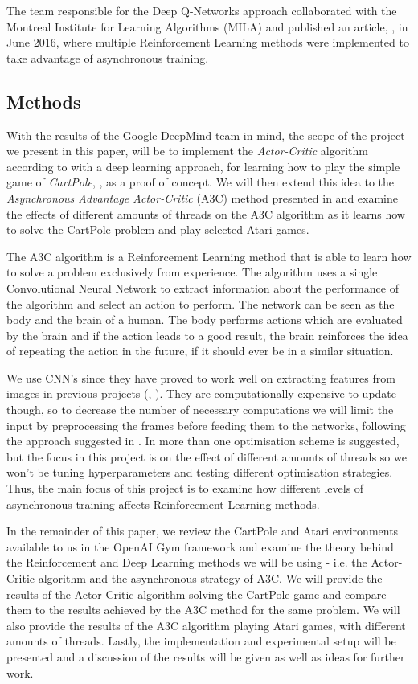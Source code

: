 \documentclass[11pt]{article}
\begin{document}
The team responsible for the Deep Q-Networks approach collaborated with
the Montreal Institute for Learning Algorithms (MILA) and published
an article, \cite{a3c}, in June 2016, where multiple Reinforcement Learning methods were implemented to
take advantage of asynchronous training.

\subsection{Methods}

With the results of the Google DeepMind team in mind, the scope of the project we present in
this paper, will be to implement the \textit{Actor-Critic} algorithm according to \cite{RLbook}
with a deep learning approach, for learning how to play the simple game of \textit{CartPole}, \cite{cart_pole},
as a proof of concept.
We will then extend this idea to the \textit{Asynchronous Advantage Actor-Critic} (A3C)
method presented in \cite{a3c} and examine the effects of different amounts of threads
on the A3C algorithm as it learns how to solve the CartPole problem and play selected Atari games.

The A3C algorithm is a Reinforcement Learning method that is able to learn
how to solve a problem exclusively from experience.
The algorithm uses a single Convolutional Neural Network to extract information
about the performance of the algorithm and select an action to perform.
The network can be seen as the body and the brain of a human.
The body performs actions which are evaluated by the brain and if
the action leads to a good result, the brain reinforces the idea
of repeating the action in the future, if it should ever be in a similar
situation.

We use CNN's since they have proved to work well on extracting features
from images in previous projects (\cite{dqn}, \cite{a3c}).
They are computationally expensive to update though,
so to decrease the number of necessary computations we will limit
the input by preprocessing the frames before feeding them
to the networks, following the approach suggested in \cite{dqn-nature}.
In \cite{a3c} more than one optimisation scheme
is suggested, but the focus in this project is on the effect of
different amounts of threads so we won't be tuning hyperparameters
and testing different optimisation strategies.
Thus, the main focus of this project is to examine how different levels of asynchronous
training affects Reinforcement Learning methods.

In the remainder of this paper, we review the 
CartPole and Atari environments available to us in
the OpenAI Gym framework and examine the theory behind the
Reinforcement and Deep Learning methods we will be using
- i.e. the Actor-Critic algorithm and the asynchronous strategy of A3C.
We will provide the results of the Actor-Critic algorithm
solving the CartPole game and compare them to the results achieved by the A3C method
for the same problem.
We will also provide the results of the A3C algorithm playing Atari games, with different 
amounts of threads. 
Lastly, the implementation and experimental setup will be presented and
a discussion of the results will be given as well as ideas for further
work.
\end{document}
